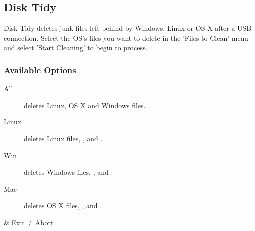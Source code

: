 \subsection{Disk Tidy}
  Disk Tidy deletes junk files left behind by Windows, Linux or OS X after a USB connection.
  Select the OS's files you want to delete in the 'Files to Clean' menu and select 'Start Cleaning' to begin to process.

  \subsubsection{Available Options}
  \begin{description}
    \item[All] deletes Linux, OS X and Windows files.
    \item[Linux] deletes Linux files, , and .
    \item[Win] deletes Windows files, ,  and
      .
    \item[Mac] deletes OS X files, ,  and
      .
  \end{description}
  
  \begin{table}
    \begin{btnmap}{}{}
      & Exit\ /\ Abort\\
    \end{btnmap}
\end{table}
